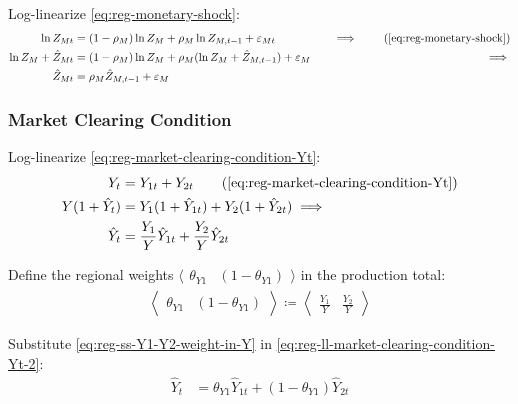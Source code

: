 \documentclass[../thesis.tex]{subfiles}
\begin{document}
Log-linearize \ref{eq:reg-monetary-shock}:
\begin{alignat}{2}
	\ln{Z_{Mt}} &= (1-\rho_M)\ln{Z_M} + \rho_M\ln{Z_{M,t-1}} + \varepsilon_{Mt} &\implies \tag{\ref{eq:reg-monetary-shock}} \\
	\ln{Z_{M}} + \hat{Z}_{Mt} &= (1-\rho_M) \ln{Z_M} + \rho_M (\ln{Z_{M}} + \hat{Z}_{M,t-1}) + \varepsilon_{M} \quad &\implies \nonumber \\
	\hat{Z}_{Mt} &= \rho_M \hat{Z}_{M,t-1} + \varepsilon_{M} \label{eq:reg-ll-monetary-shock}
\end{alignat}


\subsubsection*{Market Clearing Condition}

Log-linearize \ref{eq:reg-market-clearing-condition-Yt}:
\begin{alignat}{2}
	Y_{t} &= Y_{1 t} + Y_{2 t} \tag{\ref{eq:reg-market-clearing-condition-Yt}} \\
	Y (1 +\hat{Y}_{t}) &= Y_{1} (1 +\hat{Y}_{1t}) + Y_{2} (1 +\hat{Y}_{2t}) \implies \nonumber \\
	\hat{Y}_{t} &= \frac{Y_{1}}{Y} \hat{Y}_{1t} + \frac{Y_{2}}{Y} \hat{Y}_{2t} \label{eq:reg-ll-market-clearing-condition-Yt-2}
\end{alignat}

Define the regional weights $\langle \begin{smallmatrix} \theta_{Y1} & (1-\theta_{Y1}) \end{smallmatrix} \rangle$ in the production total:
\begin{align}
	\left\langle \begin{matrix} \theta_{Y1} & (1-\theta_{Y1}) \end{matrix} \right\rangle \coloneq \left\langle \begin{matrix} \frac{Y_{1}}{Y} & \frac{Y_{2}}{Y} \end{matrix} \right\rangle \label{eq:reg-ss-Y1-Y2-weight-in-Y}
\end{align}

Substitute \ref{eq:reg-ss-Y1-Y2-weight-in-Y} in \ref{eq:reg-ll-market-clearing-condition-Yt-2}:
\begin{align}
	\hat{Y}_{t} &= \theta_{Y1} \hat{Y}_{1t} + (1-\theta_{Y1}) \hat{Y}_{2t} \label{eq:reg-ll-market-clearing-condition-Yt-3}
\end{align}
\end{document}
